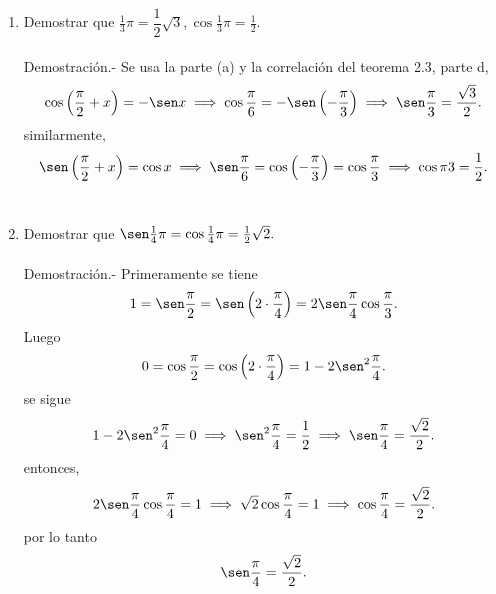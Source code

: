 \begin{enumerate}[\bfseries 1.]
\begin{enumerate}[\bfseries (a)]
    \item Demostrar que $\frac{1}{3}\pi = \dfrac{1}{2}\sqrt{3}, \cos\frac{1}{3}\pi = \frac{1}{2}$.\\\\
	Demostración.-\; Se usa la parte (a) y la correlación del teorema 2.3, parte d,
	$$\cos\left(\dfrac{\pi}{2}+x\right) = -\sen x \; \Longrightarrow \; \cos\dfrac{\pi}{6}=-\sen\left(-\dfrac{\pi}{3}\right) \; \Longrightarrow \; \sen\dfrac{\pi}{3}=\dfrac{\sqrt{3}}{2}.$$
	similarmente,
	$$\sen\left(\dfrac{\pi}{2}+x\right) = \cos x \; \Longrightarrow \; \sen\dfrac{\pi}{6} = \cos\left(-\dfrac{\pi}{3}\right)=\cos\dfrac{\pi}{3} \; \Longrightarrow \; \cos{\pi}{3}=\dfrac{1}{2}.$$\\

    \item Demostrar que $\sen\frac{1}{4} \pi = \cos\frac{1}{4}\pi = \frac{1}{2}\sqrt{2}.$\\\\
	Demostración.-\; Primeramente se tiene $$1=\sen\dfrac{\pi}{2} = \sen\left(2\cdot \dfrac{\pi}{4}\right) = 2\sen\dfrac{\pi}{4}\cos\dfrac{\pi}{3}.$$
	Luego $$0=\cos\dfrac{\pi}{2}=\cos\left(2\cdot \dfrac{\pi}{4}\right)=1-2\sen^2 \dfrac{\pi}{4}.$$
	se sigue $$1-2\sen^2\dfrac{\pi}{4}=0 \; \Longrightarrow \; \sen^2 \dfrac{\pi}{4} = \dfrac{1}{2} \; \Longrightarrow \; \sen \dfrac{\pi}{4}=\dfrac{\sqrt{2}}{2}.$$
	    entonces, $$2\sen\dfrac{\pi}{4}\cos\dfrac{\pi}{4}=1 \; \Longrightarrow\; \sqrt{2}\cos \dfrac{\pi}{4}=1 \; \Longrightarrow\; \cos \dfrac{\pi}{4}=\dfrac{\sqrt{2}}{2}.$$
	    por lo tanto $$\sen\dfrac{\pi}{4}=\dfrac{\sqrt{2}}{2}.$$\\

\end{enumerate}


\end{enumerate}

